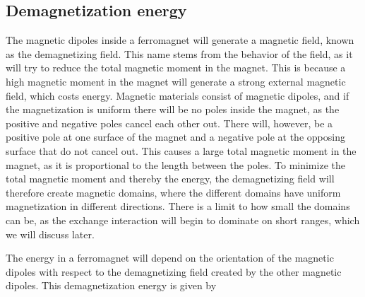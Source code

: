 \documentclass[12pt, a4paper, twoside, openright]{article}		%
\numberwithin{equation}{section}
\begin{document}
\subsection{Demagnetization energy}
The magnetic dipoles inside a ferromagnet will generate a magnetic field, known as the demagnetizing field. This name stems from the behavior of the field, as it will try to reduce the total magnetic moment in the magnet. This is because a high magnetic moment in the magnet will generate a strong external magnetic field, which costs energy. Magnetic materials consist of magnetic dipoles, and if the magnetization is uniform there will be no poles inside the magnet, as the positive and negative poles cancel each other out. There will, however, be a positive pole at one surface of the magnet and a negative pole at the opposing surface that do not cancel out. This causes a large total magnetic moment in the magnet, as it is proportional to the length between the poles. To minimize the total magnetic moment and thereby the energy, the demagnetizing field will therefore create magnetic domains, where the different domains have uniform magnetization in different directions. There is a limit to how small the domains can be, as the exchange interaction will begin to dominate on short ranges, which we will discuss later. 

The energy in a ferromagnet will depend on the orientation of the magnetic dipoles with respect to the demagnetizing field created by the other magnetic dipoles. This demagnetization energy is given by
\end{document}
